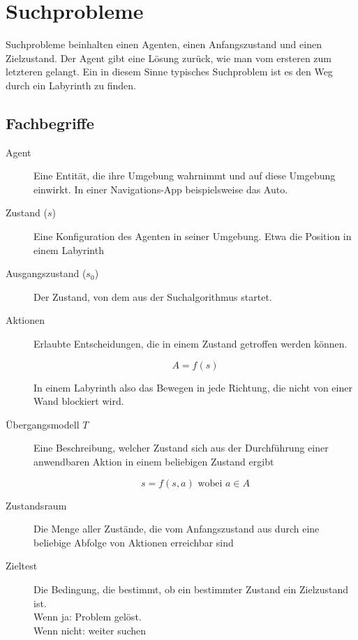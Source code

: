 \section{Suchprobleme}

Suchprobleme beinhalten einen Agenten, einen Anfangszustand und einen Zielzustand. Der Agent gibt eine Lösung zurück, wie man vom ersteren zum letzteren gelangt. Ein in diesem Sinne typisches Suchproblem ist es den Weg durch ein Labyrinth zu finden.

\subsection{Fachbegriffe}
 
\begin{description}
 \item [Agent] Eine Entität, die ihre Umgebung wahrnimmt und auf diese Umgebung einwirkt. In einer Navigations-App beispielsweise das Auto.

 \item [Zustand ($s$)] Eine Konfiguration des Agenten in seiner Umgebung. Etwa die Position in einem Labyrinth

 \item [Ausgangszustand ($s_0$)] Der Zustand, von dem aus der Suchalgorithmus startet. 

 \item [Aktionen] Erlaubte Entscheidungen, die in einem Zustand getroffen werden können. 
    
    \begin{equation}
     A = f(s)
    \end{equation}
    
    In einem Labyrinth also das Bewegen in jede Richtung, die nicht von einer Wand blockiert wird.
    
 \item [Übergangsmodell $T$] Eine Beschreibung, welcher Zustand sich aus der Durchführung einer anwendbaren Aktion in einem beliebigen Zustand ergibt

    \begin{equation}
     s = f(s, a) \text{~wobei~} a \in A
    \end{equation}

 \item [Zustandsraum] Die Menge aller Zustände, die vom Anfangszustand aus durch eine beliebige Abfolge von Aktionen erreichbar sind
 
 \item [Zieltest] Die Bedingung, die bestimmt, ob ein bestimmter Zustand ein Zielzustand ist.\\
 Wenn ja: Problem gelöst. \\
 Wenn nicht: weiter suchen


\end{description}
